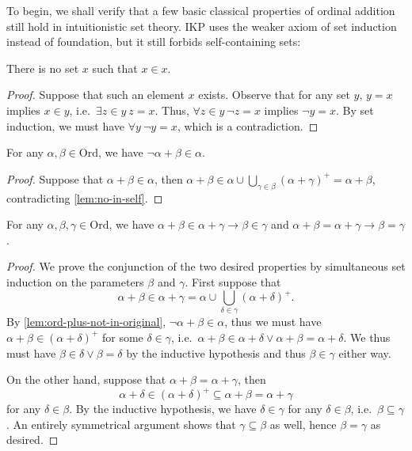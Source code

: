 \documentclass{asl}
\theoremstyle{plain}
\newcommand{\Ord}{\mathrm{Ord}}
\begin{document}
To begin, we shall verify that a few basic classical properties of ordinal addition still hold in intuitionistic set theory. $\mathrm{IKP}$ uses the weaker axiom of set induction instead of foundation, but it still forbids self-containing sets:

\begin{lemma}
  \label{lem:no-in-self}
  There is no set $x$ such that $x \in x$.
\end{lemma}

\begin{proof}
  Suppose that such an element $x$ exists. Observe that for any set $y$, $y = x$ implies $x \in y$, i.e.\ $\exists z \in y \ z = x$. Thus, $\forall z \in y \ \neg z = x$ implies $\neg y = x$. By set induction, we must have $\forall y \ \neg y = x$, which is a contradiction.
\end{proof}

\begin{lemma}
  \label{lem:ord-plus-not-in-original}
  For any $\alpha, \beta \in \Ord$, we have $\neg \alpha + \beta \in \alpha$.
\end{lemma}

\begin{proof}
  Suppose that $\alpha + \beta \in \alpha$, then $\alpha + \beta \in \alpha \cup \bigcup_{\gamma \in \beta} \left(\alpha + \gamma\right)^+ = \alpha + \beta$, contradicting \autoref{lem:no-in-self}.
\end{proof}

\begin{lemma}
  \label{lem:ord-plus-inj}
  For any $\alpha, \beta, \gamma \in \Ord$, we have $\alpha + \beta \in \alpha + \gamma \rightarrow \beta \in \gamma$ and $\alpha + \beta = \alpha + \gamma \rightarrow \beta = \gamma$.
\end{lemma}

\begin{proof}
  We prove the conjunction of the two desired properties by simultaneous set induction on the parameters $\beta$ and $\gamma$. First suppose that
  \[\alpha + \beta \in \alpha + \gamma = \alpha \cup \bigcup_{\delta \in \gamma} \left(\alpha + \delta\right)^+.\]
  By \autoref{lem:ord-plus-not-in-original}, $\neg \alpha + \beta \in \alpha$, thus we must have $\alpha + \beta \in \left(\alpha + \delta\right)^+$ for some $\delta \in \gamma$, i.e.\ $\alpha + \beta \in \alpha + \delta \lor \alpha + \beta = \alpha + \delta$. We thus must have $\beta \in \delta \lor \beta = \delta$ by the inductive hypothesis and thus $\beta \in \gamma$ either way.

  On the other hand, suppose that $\alpha + \beta = \alpha + \gamma$, then
  \[\alpha + \delta \in \left(\alpha + \delta\right)^+ \subseteq \alpha + \beta = \alpha + \gamma\]
  for any $\delta \in \beta$. By the inductive hypothesis, we have $\delta \in \gamma$ for any $\delta \in \beta$, i.e.\ $\beta \subseteq \gamma$. An entirely symmetrical argument shows that $\gamma \subseteq \beta$ as well, hence $\beta = \gamma$ as desired.
\end{proof}
\end{document}
